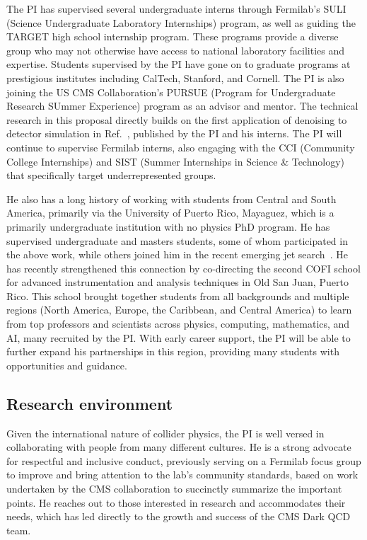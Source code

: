 The PI has supervised several undergraduate interns through Fermilab's SULI (Science Undergraduate Laboratory Internships) program,
as well as guiding the TARGET high school internship program.
These programs provide a diverse group who may not otherwise have access to national laboratory facilities and expertise.
Students supervised by the PI have gone on to graduate programs at prestigious institutes including CalTech, Stanford, and Cornell.
The PI is also joining the US CMS Collaboration's PURSUE (Program for Undergraduate Research SUmmer Experience) program as an advisor and mentor.
The technical research in this proposal directly builds on the first application of denoising to detector simulation in Ref.~\cite{Banerjee:2022gkg},
published by the PI and his interns.
The PI will continue to supervise Fermilab interns, also engaging with the CCI (Community College Internships) and SIST (Summer Internships in Science \& Technology)
that specifically target underrepresented groups.

He also has a long history of working with students from Central and South America,
primarily via the University of Puerto Rico, Mayaguez, which is a primarily undergraduate institution with no physics PhD program.
He has supervised undergraduate and masters students, some of whom participated in the above work,
while others joined him in the recent emerging jet search~\cite{CMS:2024emj}.
He has recently strengthened this connection by co-directing
the second COFI school for advanced instrumentation and analysis techniques in Old San Juan, Puerto Rico.
This school brought together students from all backgrounds and multiple regions (North America, Europe, the Caribbean, and Central America)
to learn from top professors and scientists across physics, computing, mathematics, and AI, many recruited by the PI.
With early career support, the PI will be able to further expand his partnerships in this region,
providing many students with opportunities and guidance.

\subsection{Research environment}

Given the international nature of collider physics,
the PI is well versed in collaborating with people from many different cultures.
He is a strong advocate for respectful and inclusive conduct,
previously serving on a Fermilab focus group to improve and bring attention to the lab's community standards,
based on work undertaken by the CMS collaboration to succinctly summarize the important points.
He reaches out to those interested in research and accommodates their needs,
which has led directly to the growth and success of the CMS Dark QCD team.

